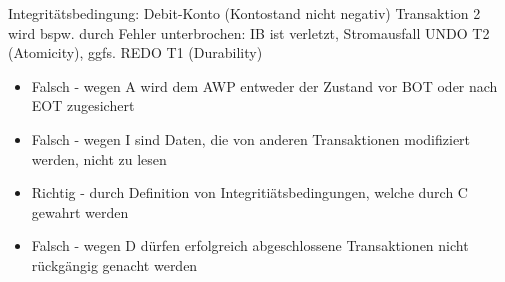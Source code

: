 \documentclass[a4paper,12pt]{article}
\begin{document}
    Integritätsbedingung: Debit-Konto (Kontostand nicht negativ)
    Transaktion 2 wird bspw. durch Fehler unterbrochen: IB ist verletzt, Stromausfall
    UNDO T2 (Atomicity), ggfs. REDO T1 (Durability)

    \begin{itemize}
        \item Falsch - wegen A wird dem AWP entweder der Zustand vor BOT oder nach EOT zugesichert
        \item Falsch - wegen I sind Daten, die von anderen Transaktionen modifiziert werden, nicht zu lesen
        \item Richtig - durch Definition von Integritiätsbedingungen, welche durch C gewahrt werden
        \item Falsch - wegen D dürfen erfolgreich abgeschlossene Transaktionen nicht rückgängig genacht werden
        \end{itemize}
    \newpage

\end{document}
